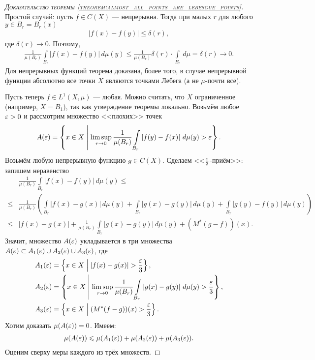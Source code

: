\begin{proof}[\normalfont\textsc{Доказательство теоремы \ref{theorem:almost_all_points_are_lebesgue_points}}] 
 Простой случай: пусть $f \in C(X)$  --- непрерывна. Тогда при малых $r$ для любого $y \in B_r = B_r(x)$ \begin{align*}
  \left| f(x) - f(y) \right| \leqslant \delta(r)
 ,\end{align*} где $\delta(r) \to 0$. Поэтому, \begin{align*}
  \frac{1}{\mu(B_r)} \int\limits_{B_r} \left| f(x) - f(y) \right| \, d\mu(y) \leqslant \frac{1}{\mu(B_r)} \delta(r) \cdot \int\limits_{B_r} \, d\mu   = \delta(r) \to 0
 .\end{align*} Для непрерывных функций теорема доказана, более того, в случае непрерывной функции абсолютно все точки $X$ являются точками Лебега (а не $\mu$-почти все).

 Пусть теперь  $f \in L^{1}(X, \mu)$ --- любая. Можно считать, что $X$ ограниченное (например, $X = B_1$), так как утверждение теоремы локально. Возьмём любое $\varepsilon > 0$ и рассмотрим множество <<плохих>> точек \begin{align*}
  A(\varepsilon) = \left\{ x \in X \;\middle|\; \limsup_{r \to 0} \frac{1}{\mu(B_r)} \int\limits_{B_r}  \left| f(y) - f(x) \right| \, d\mu(y) > \varepsilon   \right\}
 .\end{align*} Возьмём любую непрерывную функцию $g \in C(X)$. Сделаем <<$\frac{\varepsilon}{3}$-приём>>: запишем неравенство \begin{align*}
 &\frac{1}{\mu(B_r)} \int\limits_{B_r} \left| f(x) - f(y) \right| \, d\mu(y) \leqslant \\
 \leqslant &\frac{1}{\mu(B_r)} \left( \int\limits_{B_r} \left| f(x) - g(x) \right| \, d\mu(y)  + \int\limits_{B_r} \left| g(x) - g(y) \right| \, d\mu(y)  + \int\limits_{B_r} \left| g(y) - f(y) \right| \, d\mu(y) \right) \\
 \leqslant &\left| f(x) - g(x) \right| + \frac{1}{\mu(B_r)} \int\limits_{B_r} \left| g(x) - g(y) \right| \, d\mu(y) + (M^{\ast}(g-f))(x)
 .\end{align*} Значит, множество $A(\varepsilon)$ укладывается в три множества $A(\varepsilon) \subset A_1(\varepsilon) \cup A_2(\varepsilon) \cup A_3(\varepsilon)$, где \begin{align*}
 A_1(\varepsilon) &= \left\{ x \in X \;\middle|\; \left| f(x) - g(x) \right| > \frac{\varepsilon}{3} \right\}, \\
 A_2(\varepsilon) &= \left\{ x \in X \;\middle|\; \limsup_{r \to 0} \frac{1}{\mu(B_r)} \int\limits_{B_r} \left| g(x) - g(y) \right| \, d\mu(y) > \frac{\varepsilon}{3}   \right\}, \\
 A_3(\varepsilon) &= \left\{ x \in X \;\middle|\; (M^{\ast}(f-g))(x) > \frac{\varepsilon}{3} \right\}
 .\end{align*} Хотим доказать $\mu(A(\varepsilon)) = 0$. Имеем:  \begin{align*}
  \mu(A(\varepsilon)) \leqslant \mu(A_1(\varepsilon)) + \mu(A_2(\varepsilon)) + \mu(A_3(\varepsilon))
 .\end{align*} Оценим сверху меры каждого из трёх множеств.


\end{proof}
